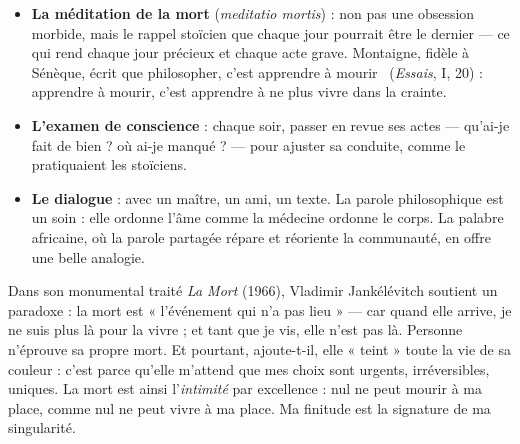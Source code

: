 \documentclass[11pt]{article}
\newcounter{popsec}
\newcounter{popsub}
\newcommand{\courssub}[1]{%
  \stepcounter{popsub}%
  \par\vspace{9pt}\noindent{\popxbold\fontsize{11.5}{13}\selectfont\color{popink}{\color{poporange}\thepopsec.\thepopsub}\hspace{6pt}#1}\par\nopagebreak\vspace{4pt}
}
\begin{document}
\begin{itemize}
  \item \textbf{La méditation de la mort} (\emph{meditatio mortis}) : non pas une obsession morbide, mais le rappel stoïcien que chaque jour pourrait être le dernier — ce qui rend chaque jour précieux et chaque acte grave. Montaigne, fidèle à Sénèque, écrit que \guillemotleft philosopher, c'est apprendre à mourir \guillemotright\ (\emph{Essais}, I, 20) : apprendre à mourir, c'est apprendre à ne plus vivre dans la crainte.
  \item \textbf{L'examen de conscience} : chaque soir, passer en revue ses actes — qu'ai-je fait de bien ? où ai-je manqué ? — pour ajuster sa conduite, comme le pratiquaient les stoïciens.
  \item \textbf{Le dialogue} : avec un maître, un ami, un texte. La parole philosophique est un soin : elle ordonne l'âme comme la médecine ordonne le corps. La palabre africaine, où la parole partagée répare et réoriente la communauté, en offre une belle analogie.
\end{itemize}

\begin{savaistu}
Dans son monumental traité \emph{La Mort} (1966), Vladimir Jankélévitch soutient un paradoxe : la mort est « l'événement qui n'a pas lieu » — car quand elle arrive, je ne suis plus là pour la vivre ; et tant que je vis, elle n'est pas là. Personne n'éprouve sa propre mort. Et pourtant, ajoute-t-il, elle « teint » toute la vie de sa couleur : c'est parce qu'elle m'attend que mes choix sont urgents, irréversibles, uniques. La mort est ainsi l'\emph{intimité} par excellence : nul ne peut mourir à ma place, comme nul ne peut vivre à ma place. Ma finitude est la signature de ma singularité.
\end{savaistu}

\courssub{Lien avec le Baccalauréat}
\end{document}
